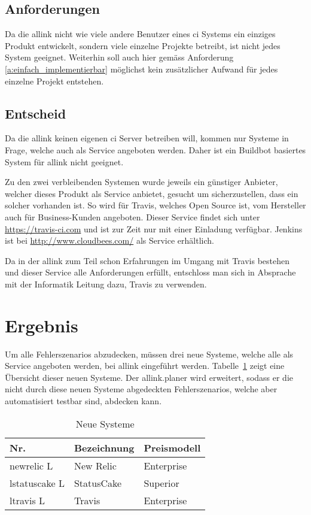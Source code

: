 \subsection{Anforderungen}
\label{sub:anforderungen}
Da die allink nicht wie viele andere Benutzer eines \acrshort{ci} Systems ein einziges Produkt entwickelt, sondern viele einzelne Projekte betreibt, ist nicht jedes System geeignet. Weiterhin soll auch hier gemäss Anforderung \ref{a:einfach_implementierbar} möglichst kein zusätzlicher Aufwand für jedes einzelne Projekt entstehen.

\subsection{Entscheid}
\label{sub:entscheid_ci}
Da die allink keinen eigenen \acrshort{ci} Server betreiben will, kommen nur Systeme in Frage, welche auch als Service angeboten werden. Daher ist ein Buildbot basiertes System für allink nicht geeignet.

Zu den zwei verbleibenden Systemen wurde jeweils ein günstiger Anbieter, welcher dieses Produkt als Service anbietet, gesucht um sicherzustellen, dass ein solcher vorhanden ist. So wird für Travis, welches Open Source ist, vom Hersteller auch für Business-Kunden angeboten. Dieser Service findet sich unter \url{https://travis-ci.com} und ist zur Zeit nur mit einer Einladung verfügbar. Jenkins ist bei \url{http://www.cloudbees.com/} als Service erhältlich.
 
Da in der allink zum Teil schon Erfahrungen im Umgang mit Travis bestehen und dieser Service alle Anforderungen erfüllt, entschloss man sich in Absprache mit der Informatik Leitung dazu, Travis zu verwenden.

\section{Ergebnis}
\label{sec:ergebnis}
Um alle Fehlerszenarios abzudecken, müssen drei neue Systeme, welche alle als Service angeboten werden, bei allink eingeführt werden. Tabelle~\ref{tab:neue_systeme} zeigt eine Übersicht dieser neuen Systeme. Der allink.planer wird erweitert, sodass er die nicht durch diese neuen Systeme abgedeckten Fehlerszenarios, welche aber automatisiert testbar sind, abdecken kann.

\makeatletter
{} \setcounter{lnumber}{0}
\renewcommand\thelnumber{L\arabic{lnumber}}
\newcommand{\newlnumber}[3]%
{%
\midrule%
\refstepcounter{lnumber}%
\expandafter\xdef\csname l#2\endcsname {#1}%
\thelnumber\label{l:#2} & #1 & #3 \\
}
\makeatother

\begin{table}[ht]
  \centering
  \begin{tabular}{l>{\raggedright} p{5cm} p{5cm}}
    \toprule \textbf{Nr.} & \textbf{Bezeichnung} & \textbf{Preismodell} \\
    \newlnumber{New Relic}{newrelic}{Enterprise}
    \newlnumber{StatusCake}{statuscake}{Superior}
    \newlnumber{Travis}{travis}{Enterprise}
    \bottomrule
  \end{tabular}
  \caption{Neue Systeme}
  \label{tab:neue_systeme}
\end{table}
